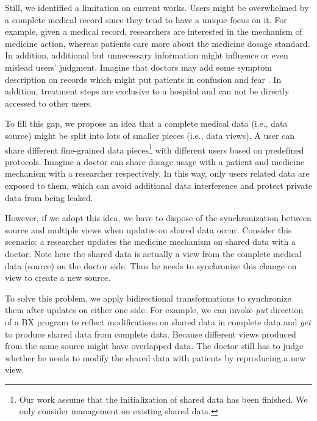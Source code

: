 \documentclass[conference]{IEEEtran}
\begin{document}

Still, we identified a limitation on current works. Users might be overwhelmed by a complete medical record since they tend to have a unique focus on it. For example, given a medical record, researchers are interested in the mechanism of medicine action, whereas patients care more about the medicine dosage standard.  In addition, additional but unnecessary information might influence or even mislead users' judgment. Imagine that doctors may add some symptom description on records which might put patients in confusion and fear \cite{delbanco2010open}. In addition, treatment steps are exclusive to a hospital and can not be directly accessed to other users.

To fill this gap, we propose an idea that a complete medical data (i.e., data source) might be split into lots of smaller pieces (i.e., data views). A user can share different fine-grained data pieces\footnote{Our work assume that the initialization of shared data has been finished. We only consider management on existing shared data.}  with different users based on predefined protocols. Imagine a doctor can share dosage usage with a patient and medicine mechanism with a researcher respectively. In this way, only users related data are exposed to them, which can avoid additional data interference and protect private data from being leaked. 

However, if we adopt this idea, we have to dispose of the synchronization between source and multiple views when updates on shared data occur. Consider this scenario: a researcher updates the medicine mechanism on shared data with a doctor. Note here the shared data is actually a view from the complete medical data (source) on the doctor side. Thus he needs to synchronize this change on view to create a new source. 


To solve this problem, we apply bidirectional transformations \cite{hu2014validity} to synchronize them after updates on either one side. For example, we can invoke \emph{put} direction of a  BX program to reflect modifications on shared data in complete data and \emph{get} to produce shared data from complete data. Because different views produced from the same source might have overlapped data. The doctor still has to judge whether he needs to modify the shared data with patients by reproducing a new view.
\end{document}
